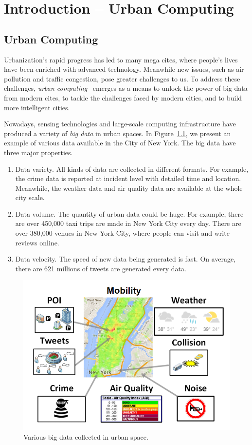\chapter{Introduction -- Urban Computing} 
\label{chapter1:introduction}



\section{Urban Computing}

Urbanization's rapid progress has led to many mega cites, where people's lives have been enriched with advanced technology. Meanwhile new issues, such as air pollution and traffic congestion, pose greater challenges to us. To address these challenges, \emph{urban computing}~\cite{zheng2014urban} emerges as a means to unlock the power of big data from modern cites, to tackle the challenges faced by modern cities,  and to build more intelligent cities.

Nowadays, sensing technologies and large-scale computing infrastructure have produced a variety of \emph{big data} in urban spaces. In Figure~\ref{fig:intro}, we present an example of various data available in the City of New York. The big data have three major properties. 
\begin{enumerate}
\item Data variety. All kinds of data are collected in different formats. For example, the crime data is reported at incident level with detailed time and location. Meanwhile, the weather data and air quality data are available at the whole city scale.
\item Data volume. The quantity of urban data could be huge. For example, there are over 450,000 taxi trips are made in New York City every day. There are over 380,000 venues in New York City, where people can visit and write reviews online.
\item Data velocity. The speed of new data being generated is fast. On average, there are 621 millions of tweets are generated every data.
\end{enumerate}

\begin{figure}[h]
\centering
\includegraphics[width=0.8\linewidth]{fig/intro-data-v2.png}
\caption{Various big data collected in urban space.}
\label{fig:intro}
\end{figure}

